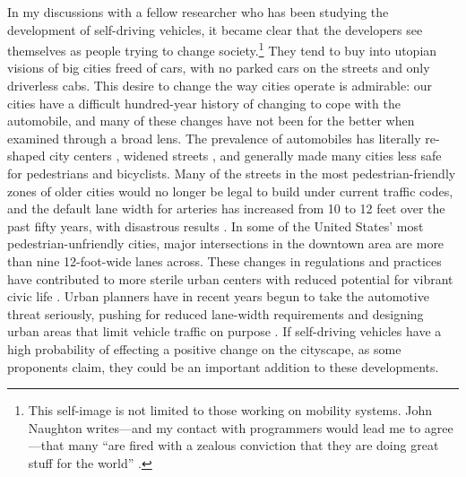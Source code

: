 In my discussions with a fellow researcher who has been studying the
development of self-driving vehicles, it became clear that the
developers see themselves as people trying to change
society.\footnote{This self-image is not limited to those working on
  mobility systems. John Naughton writes---and my contact with
  programmers would lead me to agree---that many ``are fired with a zealous
  conviction that they are doing great stuff for the
  world'' \cite{naughtonTech}.}
They
tend to buy into utopian visions of big cities freed of cars, with no
parked cars on the streets and only driverless cabs. This desire to
change the way cities operate is admirable: our cities have a
difficult hundred-year history of changing to cope with the
automobile, and many of these changes have not been for the better
when examined through a broad lens. The prevalence of automobiles has
literally re-shaped city centers \cite[p. 7]{burdenCities}, widened
streets \cite[p. 10]{burdenCities} \cite[p. 65]{fernandezBoulder}, and generally made many cities less safe for
pedestrians and bicyclists. Many of the streets in the most
pedestrian-friendly zones of older cities would no longer be legal to
build under 
current traffic codes, and the default lane width for arteries has increased
from 10 to 12 feet over the past fifty years, with disastrous results \cite{citylab}. In some of the
United States' most pedestrian-unfriendly cities, major intersections
in the downtown area are more than nine 12-foot-wide lanes across. These changes in 
regulations and practices have contributed to more sterile urban
centers with reduced potential for vibrant civic life \cite[p. 60]{miaraBoston}. Urban planners have
in recent years begun to take the automotive threat seriously, pushing
for reduced lane-width requirements and designing urban areas that
limit vehicle traffic on purpose \cite[p. 67]{fernandezBoulder}. If self-driving
vehicles have a high probability of effecting a positive change on the
cityscape, as some proponents claim, they could be an important
addition to these developments.

